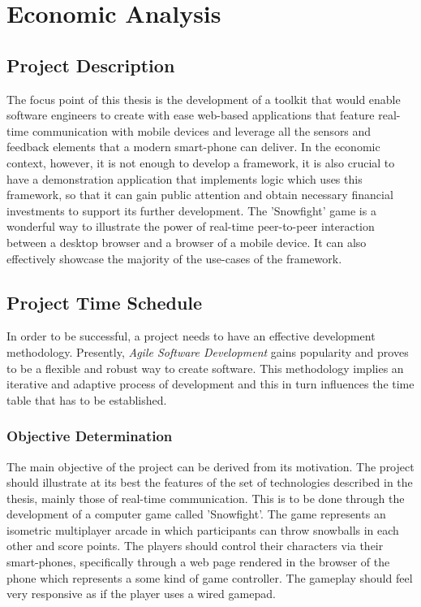 \section{Economic Analysis}

\subsection{Project Description}

The focus point of this thesis is the development of a toolkit that would
enable software engineers to create with ease web-based applications that
feature real-time communication with mobile devices and leverage all the
sensors and feedback elements that a modern smart-phone can deliver. In the
economic context, however, it is not enough to develop a framework, it is also
crucial to have a demonstration application that implements logic which uses
this framework, so that it can gain public attention and obtain necessary
financial investments to support its further development. The 'Snowfight' game
is a wonderful way to illustrate the power of real-time peer-to-peer
interaction between a desktop browser and a browser of a mobile device. It can
also effectively showcase the majority of the use-cases of the framework.

\subsection{Project Time Schedule}

In order to be successful, a project needs to have an effective development
methodology. Presently, \emph{Agile Software Development} gains popularity and
proves to be a flexible and robust way to create software. This methodology
implies an iterative and adaptive process of development and this in turn
influences the time table that has to be established.

\subsubsection{Objective Determination}

The main objective of the project can be derived from its motivation. The
project should illustrate at its best the features of the set of technologies
described in the thesis, mainly those of real-time communication. This is to be
done through the development of a computer game called 'Snowfight'. The game
represents an isometric multiplayer arcade in which participants can throw
snowballs in each other and score points. The players should control their
characters via their smart-phones, specifically through a web page rendered in
the browser of the phone which represents a some kind of game controller. The
gameplay should feel very responsive as if the player uses a wired gamepad.

